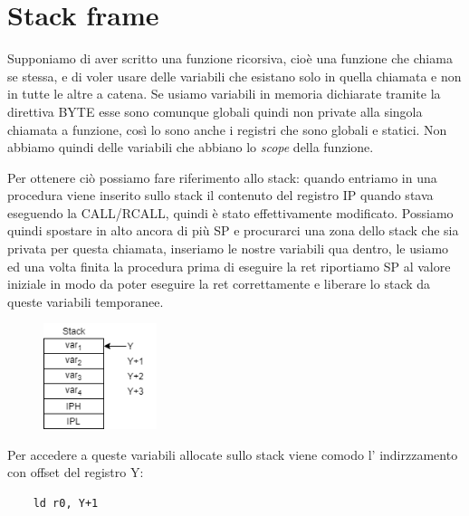 \section{Stack frame}
Supponiamo di aver scritto una funzione ricorsiva, cioè una funzione che chiama se stessa, e di voler usare delle variabili che esistano solo in quella chiamata e non in tutte le altre a catena.
Se usiamo variabili in memoria dichiarate tramite la direttiva BYTE esse sono comunque globali quindi non private alla singola chiamata a funzione, così lo sono anche i registri che sono globali e statici.
Non abbiamo quindi delle variabili che abbiano lo \emph{scope} della funzione.

Per ottenere ciò possiamo fare riferimento allo stack:
quando entriamo in una procedura viene inserito sullo stack il contenuto del registro IP quando stava eseguendo la CALL/RCALL, quindi è stato effettivamente modificato.
Possiamo quindi spostare in alto ancora di più SP e procurarci una zona dello stack che sia privata per questa chiamata, inseriamo le nostre variabili qua dentro, le usiamo ed una volta finita la procedura prima di eseguire la ret riportiamo SP al valore iniziale in modo da poter eseguire la ret correttamente e liberare lo stack da queste variabili temporanee.
\begin{figure}[H]
    \centering
    \includegraphics[width=125px]{images/20_Stack_frames/stack_frame.png}
\end{figure}
Per accedere a queste variabili allocate sullo stack viene comodo l' indirzzamento con offset del registro Y:
\begin{verbatim}
    ld r0, Y+1
\end{verbatim}

